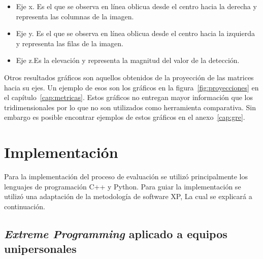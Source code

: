 \begin{itemize}
\item Eje x. Es el que se observa en línea oblicua desde el centro hacia la derecha y representa las columnas de la imagen.
\item Eje y. Es el que se observa en línea oblicua desde el centro hacia la izquierda y representa las filas de la imagen.
\item Eje z.Es la elevación y representa la magnitud del valor de la detección.
\end{itemize}

Otros resultados gráficos son aquellos obtenidos de la proyección de las matrices hacia su ejes. Un ejemplo de esos son los gráficos en la figura~\ref{fig:proyecciones} en el capítulo~\ref{cap:metricas}. Estos gráficos no entregan mayor información que los tridimensionales por lo que no son utilizados como herramienta comparativa. Sin embargo es posible encontrar ejemplos de estos gráficos en el anexo~\ref{cap:gre}.

\section{Implementación}

Para la implementación del proceso de evaluación se utilizó principalmente los lenguajes de programación C++ y Python. Para guiar la implementación se utilizó una adaptación de la metodología de software XP,                  La cual se explicará a continuación.

\subsection{\textit{Extreme Programming} aplicado a equipos unipersonales}

